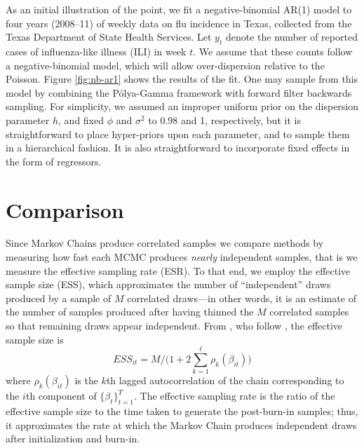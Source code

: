 \documentclass[11pt]{article}
\newcommand{\Polya}{P\'{o}lya}
\begin{document}
As an initial illustration of the point, we fit a negative-binomial AR(1) model
to four years (2008--11) of weekly data on flu incidence in Texas, collected
from the Texas Department of State Health Services.  Let $y_t$ denote the number
of reported cases of influenza-like illness (ILI) in week $t$.  We assume that
these counts follow a negative-binomial model, which will allow over-dispersion
relative to the Poisson.
Figure \ref{fig:nb-ar1} shows the results of the fit.  One may sample from this
model by combining the \Polya-Gamma framework with forward filter backwards
sampling.  For simplicity, we assumed an improper uniform prior on the
dispersion parameter $h$, and fixed $\phi$ and $\sigma^2$ to $0.98$ and 1,
respectively, but it is straightforward to place hyper-priors upon each
parameter, and to sample them in a hierarchical fashion.  It is also
straightforward to incorporate fixed effects in the form of regressors.


\section{Comparison}


Since Markov Chains produce correlated samples we compare methods by measuring
how fast each MCMC produces \emph{nearly} independent samples, that is we
measure the effective sampling rate (ESR).  To that end, we employ the effective
sample size (ESS), which approximates the number of ``independent'' draws
produced by a sample of $M$ correlated draws---in other words, it is an estimate
of the number of samples produced after having thinned the $M$ correlated
samples so that remaining draws appear independent.  From
\cite{holmes-held-2006}, who follow \cite{geyer-1992}, the effective sample size
is
\[
ESS_{it} = M / \Big( 1 + 2 \sum_{k=1}^\ell \rho_k(\beta_{it}) \Big)
\]
where $\rho_k(\beta_{it})$ is the $k$th lagged autocorrelation of the chain
corresponding to the $i$th component of $\{\beta_t\}_{t=1}^T$.  The effective
sampling rate is the ratio of the effective sample size to the time taken to
generate the post-burn-in samples; thus, it approximates the rate at which the
Markov Chain produces independent draws after initialization and burn-in.
\end{document}
